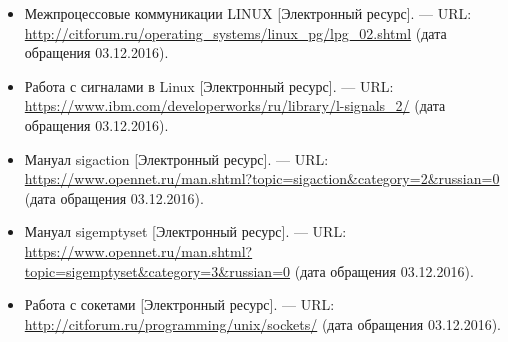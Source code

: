 \documentclass[14pt,a4paper,report]{report}
\begin{document}
\begin{itemize}
	
	\item Межпроцессовые коммуникации LINUX [Электронный ресурс]. — URL: \href{http://citforum.ru/operating_systems/linux_pg/lpg_02.shtml}{http://citforum.ru/operating\linebreak \_systems/linux\_pg/lpg\_02.shtml} (дата обращения 03.12.2016).
	
	\item Работа с сигналами в Linux [Электронный ресурс]. — URL: \href{https://www.ibm.com/developerworks/ru/library/l-signals_2/}{https://www.ibm.com/developerworks/ru/\linebreak library/l-signals\_2/} (дата обращения 03.12.2016).
	
	\item Мануал sigaction [Электронный ресурс]. — URL: \href{https://www.opennet.ru/man.shtml?topic=sigaction&category=2&russian=0}{https://www.opennet.ru/man.shtml?topic=sigaction\&\linebreak category=2\&russian=0} (дата обращения 03.12.2016).
	
	\item Мануал sigemptyset [Электронный ресурс]. — URL: \href{https://www.opennet.ru/man.shtml?topic=sigemptyset&category=3&russian=0}{https://www.opennet.ru/man.shtml?topic=sigemptyset\&\linebreak category=3\&russian=0} (дата обращения 03.12.2016).
	
	\item Работа с сокетами [Электронный ресурс]. — URL: \href{http://citforum.ru/programming/unix/sockets/}{http://citforum.ru/programming/unix/sockets/} (дата обращения 03.12.2016).
	
\end{itemize}
\end{document}
